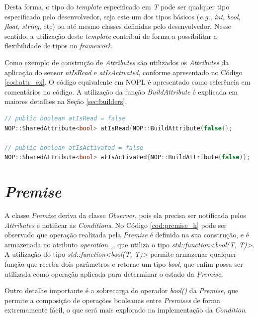 Desta forma, o tipo do \textit{template} especificado em \textit{T} pode ser
qualquer tipo especificado pelo desenvolvedor, seja este um dos tipos básicos
(\textit{e.g.}, \textit{int}, \textit{bool}, \textit{float}, \textit{string},
etc) ou até mesmo classes definidas pelo desenvolvedor. Nesse sentido, a
utilização deste \textit{template} contribui de forma a possibilitar a
flexibilidade de tipos no \textit{framework}.

Como exemplo de construção de \textit{Attributes} são utilizados os
\textit{Attributes} da aplicação do sensor \textit{atIsRead} e
\textit{atIsActivated}, conforme apresentado no Código \ref{cod:attr_ex}. O
código equivalente em NOPL é apresentado como referência em comentários no
código. A utilização da função \textit{BuildAttribute} é explicada em maiores
detalhes na Seção \ref{sec:builders}.

\begin{lstlisting}[language=C++, float=htb,
    caption = {Criação de \textit{Attributes} no \textit{Framework} PON C++ 4.0},
    source = {Autoria própria},
    label ={cod:attr_ex}]
// public boolean atIsRead = false
NOP::SharedAttribute<bool> atIsRead{NOP::BuildAttribute(false)};

// public boolean atIsActivated = false
NOP::SharedAttribute<bool> atIsActivated{NOP::BuildAttribute(false)};
\end{lstlisting}

\section{\textit{Premise}}

A classe \textit{Premise} deriva da classe \textit{Observer}, pois ela precisa
ser notificada pelos \textit{Attributes} e notificar as \textit{Conditions}. No
Código \ref{cod:premise_h} pode ser observado que operação realizada pela
\textit{Premise} é definida na sua construção, e é armazenada no atributo
\textit{operation\_}, que utiliza o tipo \textit{std::function<bool(T, T)>}. A
utilização do tipo \textit{std::function<bool(T, T)>} permite armazenar qualquer
função que receba dois parâmetros e retorne um tipo \textit{bool}, que enfim
possa ser utilizada como operação aplicada para determinar o estado da
\textit{Premise}.

Outro detalhe importante é a sobrecarga do operador \textit{bool()} da
\textit{Premise}, que permite a composição de operações booleanas entre
\textit{Premises} de forma extremamente fácil, o que será mais explorado na
implementação da \textit{Condition}.


